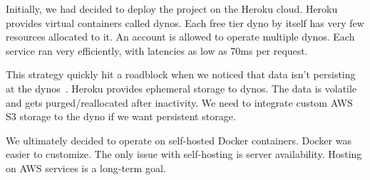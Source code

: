 Initially, we had decided to deploy the project on the Heroku cloud. Heroku provides virtual containers called dynos. Each free tier dyno by itself has very few resources allocated to it. An account is allowed to operate multiple dynos. Each service ran very efficiently, 
with latencies as low as 70ms per request.

This strategy quickly hit a roadblock when we noticed that data isn't persisting at the dynos~\cite{HerokuActiveStorage}. 
Heroku provides ephemeral storage to dynos. The data is volatile and gets purged/reallocated after inactivity.
We need to integrate custom AWS S3 storage to the dyno if we want persistent storage. 

We ultimately decided to operate on self-hosted Docker containers. Docker was easier to customize. The only issue with self-hosting is server availability. Hosting on AWS services is a long-term goal.
